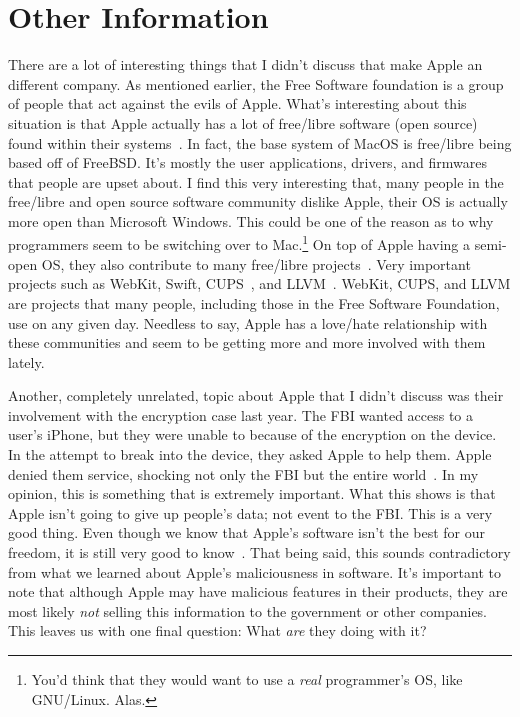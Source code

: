 \documentclass[12pt,a4paper,titlepage]{article}
\begin{document}
\section{Other Information}
There are a lot of interesting things that I didn't discuss that make Apple an
different company. As mentioned earlier, the Free Software foundation is a group
of people that act against the evils of Apple. What's interesting about this
situation is that Apple actually has a lot of free/libre software (open source)
found within their systems~\cite{open-apple}. In fact, the base system of MacOS
is free/libre being based off of FreeBSD. It's mostly the user applications,
drivers, and firmwares that people are upset about. I find this very interesting
that, many people in the free/libre and open source software community dislike
Apple, their OS is actually more open than Microsoft Windows. This could be one
of the reason as to why programmers seem to be switching over to
Mac.\footnote{You'd think that they would want to use a \emph{real} programmer's
  OS, like GNU/Linux. Alas.} On top of Apple having a semi-open OS, they also
contribute to many free/libre projects~\cite{open-apple}. Very important
projects such as WebKit, Swift, CUPS~\cite{cups}, and
LLVM~\cite{open-apple}. WebKit, CUPS, and LLVM are projects that many people,
including those in the Free Software Foundation, use on any given day. Needless
to say, Apple has a love/hate relationship with these communities and seem to
be getting more and more involved with them lately.

Another, completely unrelated, topic about Apple that I didn't discuss was their
involvement with the encryption case last year. The FBI wanted access to a
user's iPhone, but they were unable to because of the encryption on the
device. In the attempt to break into the device, they asked Apple to help
them. Apple denied them service, shocking not only the FBI but the entire
world~\cite{cnbc}. In my opinion, this is something that is extremely
important. What this shows is that Apple isn't going to give up people's data;
not event to the FBI. This is a very good thing. Even though we know that
Apple's software isn't the best for our freedom, it is still very good to
know~\cite{gnu}. That being said, this sounds contradictory from what we learned
about Apple's maliciousness in software. It's important to note that although
Apple may have malicious features in their products, they are most likely
\emph{not} selling this information to the government or other companies. This
leaves us with one final question: What \emph{are} they doing with it?
\end{document}
